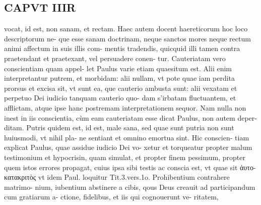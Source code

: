 \documentclass{article}
\begin{document}
\begin{pages}
\section*{CAPVT  IIIR }
\marginpar{[ p.185 ]}\pstart vocat, id est, non sanam, et rectam. Haec autem docent haereticorum hoc loco descriptorum ne- que esse sanam doctrinam, neque sanctos mores neque rectum animi affectum in suis illis com- mentis tradendis, quicquid illi tamen contra praetendant et praetexant, vel persuadere conen- tur.  \pend\pstart Cauteriatam vero conscientiam quam appel- let Paulus varie etiam quaesitum est. Alii enim interpretantur putrem, et morbidam: alii nullam, vt pote quae iam perdita prorsus et excisa sit, vt sunt ea, que cauterio ambusta sunt: alii vexatam et perpetuo Dei iudicio tanquam cauterio quo- dam s'irbatam fluctuantem, et afflictam, atque ipse hanc postremam interpretationem sequor. Nam nulla non inest in iis conscientia, cùm eam cauteriatam esse dicat Paulus, non autem deper- ditam. Putris quidem est, id est, male sana, sed quae sunt putria non sunt huiusmodi, vt nihil pla- ne sentiant et omnino emortua sint. Hic conscien- tiam explicat Paulus, quae assidue iudicio Dei vo- xetur et torqueatur propter malum testimonium et hypocrisin, quam simulat, et propter finem pessimum, propter quem istos errores propagat, cuius ipsa sibi testis ac conscia est, vt quae sit ἀυτο- κατακριτὸς vt idem Paul. loquitur Tit.3.vers.1o.  \pend\pstart * Prohibentium contrahere matrimo- nium, iubentium abstinere a cibis, qous Deus creauit ad participandum cum gratiarum a- ctione, fidelibus, et iis qui cognouerunt ve- ritatem,  \pend

\end{pages}
\end{document}
